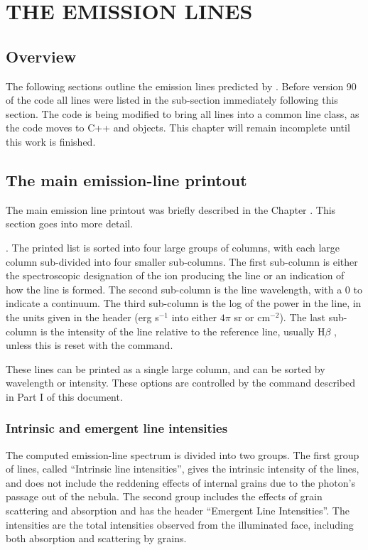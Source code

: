 \chapter{THE EMISSION LINES}
\label{sec:EmissionLines}

\section{Overview}

The following sections outline the emission lines predicted by \Cloudy.
Before version 90 of the code all lines were listed in the sub-section
immediately following this section.  The code is being modified to bring
all lines into a common line class, as the code moves to C++ and objects.
This chapter will remain incomplete until this work is finished.

\section{The main emission-line printout }

The main emission line printout was briefly described
in the Chapter .
This section
goes into more detail.

.  The printed list is sorted into four large groups
of columns, with each large column sub-divided into four smaller sub-columns.
The first sub-column is either the spectroscopic designation of the ion
producing the line or an indication of how the line is formed.  The second
sub-column is the line wavelength, with a 0 to indicate a continuum.  The
third sub-column is the log of the power in the line, in the units given
in the header (erg s$^{-1}$ into either $4\pi$ sr or cm$^{-2}$).  The last sub-column is
the intensity of the line relative to the reference line,
usually H$\beta$ , unless
this is reset with the  command.

These lines can be printed as a single large column, and can be sorted
by wavelength or intensity.  These options are controlled by the
command described in Part I of this document.

\subsection{Intrinsic and emergent line intensities}

The computed emission-line spectrum is divided into two groups.  The
first group of lines, called ``Intrinsic line intensities'', gives the
intrinsic intensity of the lines, and does not include the reddening effects
of internal grains due to the photon's passage out of the nebula.  The second
group includes the effects of grain scattering and absorption and has the
header ``Emergent Line Intensities''.  The intensities are the total
intensities observed from the illuminated face, including both absorption
and scattering by grains.

